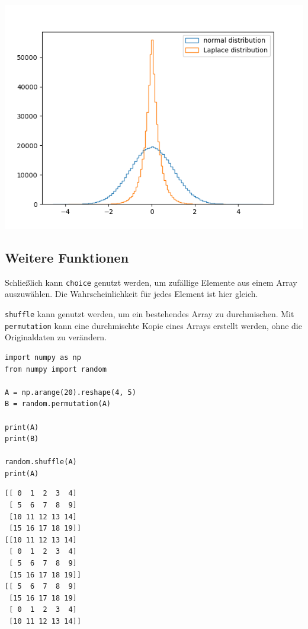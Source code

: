 \begin{tcolorbox}[title=Ausgabe: \texttt{normal} und \texttt{laplace}]
\begin{center}
	\includegraphics[width=.6\linewidth]{./gfx/gaussVsLaplace}
\end{center}
\end{tcolorbox}

\subsection{Weitere Funktionen}
Schließlich kann \texttt{choice} genutzt werden, um zufällige Elemente aus einem Array auszuwählen. Die Wahrscheinlichkeit für jedes Element ist hier gleich.

\texttt{shuffle} kann genutzt werden, um ein bestehendes Array zu durchmischen. Mit \texttt{permutation} kann eine durchmischte Kopie eines Arrays erstellt werden, ohne die Originaldaten zu verändern.

\begin{tcbraster}[raster columns=2,
                  raster equal height,
                  nobeforeafter,
                  raster column skip=0.5cm]
\begin{codebox}
\begin{verbatim}
import numpy as np
from numpy import random

A = np.arange(20).reshape(4, 5)
B = random.permutation(A)

print(A)
print(B)

random.shuffle(A)
print(A)
\end{verbatim}
\end{codebox}
%
\begin{cmdbox}
\begin{verbatim}
[[ 0  1  2  3  4]
 [ 5  6  7  8  9]
 [10 11 12 13 14]
 [15 16 17 18 19]]
[[10 11 12 13 14]
 [ 0  1  2  3  4]
 [ 5  6  7  8  9]
 [15 16 17 18 19]]
[[ 5  6  7  8  9]
 [15 16 17 18 19]
 [ 0  1  2  3  4]
 [10 11 12 13 14]]
\end{verbatim}
\end{cmdbox}
\end{tcbraster}
